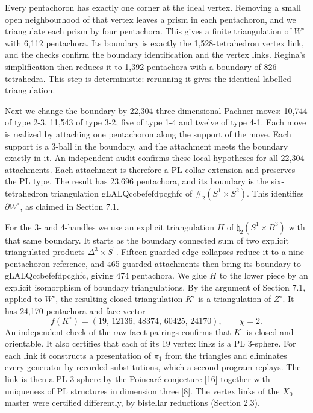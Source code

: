 \documentclass[11pt,letterpaper]{article}
\begin{document}
Every pentachoron has exactly one corner at the ideal vertex. Removing a small open neighbourhood of that vertex leaves a prism in each pentachoron, and we triangulate each prism by four pentachora. This gives a finite triangulation of $W^\circ$ with 6,112 pentachora. Its boundary is exactly the 1,528-tetrahedron vertex link, and the checks confirm the boundary identification and the vertex links. Regina's simplification then reduces it to 1,392 pentachora with a boundary of 826 tetrahedra. This step is deterministic: rerunning it gives the identical labelled triangulation.

Next we change the boundary by 22,304 three-dimensional Pachner moves: 10,744 of type 2-3, 11,543 of type 3-2, five of type 1-4 and twelve of type 4-1. Each move is realized by attaching one pentachoron along the support of the move. Each support is a 3-ball in the boundary, and the attachment meets the boundary exactly in it. An independent audit confirms these local hypotheses for all 22,304 attachments. Each attachment is therefore a PL collar extension and preserves the PL type. The result has 23,696 pentachora, and its boundary is the six-tetrahedron triangulation \mbox{\small\ttfamily gLALQccbefefdpcghfc} of $\#_2(S^1\times S^2)$. This identifies $\partial W^\circ$, as claimed in Section 7.1.

For the 3- and 4-handles we use an explicit triangulation $H$ of $\natural_2(S^1\times B^3)$ with that same boundary. It starts as the boundary connected sum of two explicit triangulated products $\Delta^3\times S^1$. Fifteen guarded edge collapses reduce it to a nine-pentachoron reference, and 465 guarded attachments then bring its boundary to \mbox{\small\ttfamily gLALQccbefefdpcghfc}, giving 474 pentachora. We glue $H$ to the lower piece by an explicit isomorphism of boundary triangulations. By the argument of Section 7.1, applied to $W^\circ$, the resulting closed triangulation $K^\circ$ is a triangulation of $Z^\circ$. It has 24,170 pentachora and face vector
\[
f(K^\circ)=(19,\,12136,\,48374,\,60425,\,24170),\qquad \chi=2.
\]
An independent check of the raw facet pairings confirms that $K^\circ$ is closed and orientable. It also certifies that each of its 19 vertex links is a PL 3-sphere. For each link it constructs a presentation of $\pi_1$ from the triangles and eliminates every generator by recorded substitutions, which a second program replays. The link is then a PL 3-sphere by the Poincaré conjecture [16] together with uniqueness of PL structures in dimension three [8]. The vertex links of the $X_0$ master were certified differently, by bistellar reductions (Section 2.3).
\end{document}
